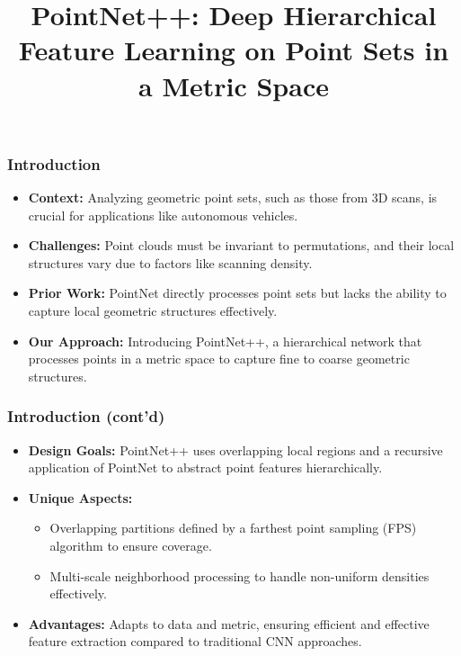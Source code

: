 \documentclass[11pt,xcolor={dvipsnames},hyperref={pdftex,pdfpagemode=UseNone,hidelinks,pdfdisplaydoctitle=true},usepdftitle=false]{beamer}
\begin{document}
\title{PointNet++: Deep Hierarchical Feature Learning on Point Sets in a Metric Space}
\frame{\titlepage}

\begin{frame}
\frametitle{Introduction}
\begin{itemize}
  \item \textbf{Context:} Analyzing geometric point sets, such as those from 3D scans, is crucial for applications like autonomous vehicles.
  \item \textbf{Challenges:} Point clouds must be invariant to permutations, and their local structures vary due to factors like scanning density.
  \item \textbf{Prior Work:} PointNet directly processes point sets but lacks the ability to capture local geometric structures effectively.
  \item \textbf{Our Approach:} Introducing PointNet++, a hierarchical network that processes points in a metric space to capture fine to coarse geometric structures.
\end{itemize}
\end{frame}

\begin{frame}
\frametitle{Introduction (cont'd)}
\begin{itemize}
  \item \textbf{Design Goals:} PointNet++ uses overlapping local regions and a recursive application of PointNet to abstract point features hierarchically.
  \item \textbf{Unique Aspects:}
    \begin{itemize}
      \item Overlapping partitions defined by a farthest point sampling (FPS) algorithm to ensure coverage.
      \item Multi-scale neighborhood processing to handle non-uniform densities effectively.
    \end{itemize}
  \item \textbf{Advantages:} Adapts to data and metric, ensuring efficient and effective feature extraction compared to traditional CNN approaches.
\end{itemize}
\end{frame}
\end{document}
